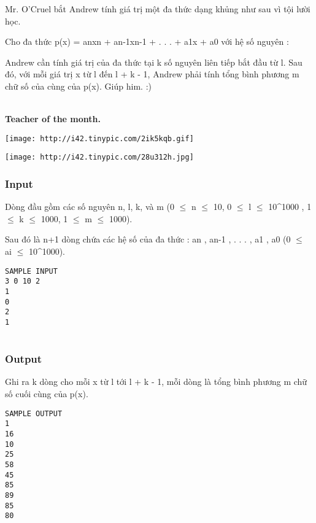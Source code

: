 

Mr. O'Cruel bắt Andrew tính giá trị một đa thức dạng khủng như sau vì tội lười học.

Cho đa thức p(x) = anxn + an-1xn-1 + . . . + a1x + a0 với hệ số nguyên :

Andrew cần tính giá trị của đa thức tại k số nguyên liên tiếp bắt đầu từ l. Sau đó, với mỗi giá trị x từ l đến l + k - 1, Andrew phải tính tổng bình phương m chữ số của cùng của p(x). Giúp him. :)


\\\textbf{Teacher of the month. }


\texttt{[image: http://i42.tinypic.com/2ik5kqb.gif]}


\texttt{[image: http://i42.tinypic.com/28u312h.jpg]}

\subsubsection{Input}

Dòng đầu gồm các số nguyên n, l, k, và m (0  $\le$  n  $\le$  10, 0  $\le$  l  $\le$  10\textasciicircum1000 , 1  $\le$  k  $\le$  1000, 1  $\le$  m  $\le$  1000).

Sau đó là n+1 dòng chứa các hệ số của đa thức : an , an-1 , . . . , a1 , a0 (0  $\le$  ai  $\le$  10\textasciicircum1000).
\begin{verbatim}
SAMPLE INPUT
3 0 10 2
1
0
2
1


\end{verbatim}

\subsubsection{Output}

Ghi ra k dòng cho mỗi x từ l tới l + k - 1, mỗi dòng là tổng bình phương m chữ số cuối cùng của p(x).
\begin{verbatim}
SAMPLE OUTPUT
1
16
10
25
58
45
85
89
85
80
\end{verbatim}

 
